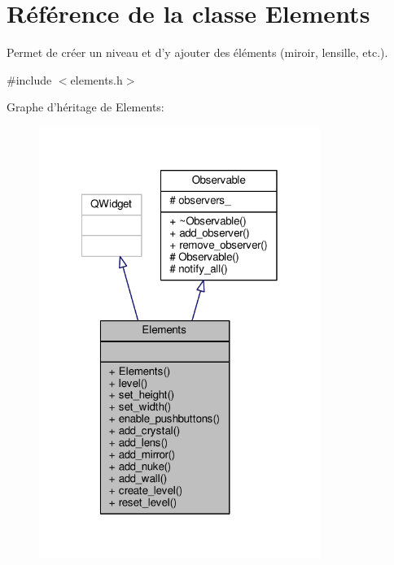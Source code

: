 \hypertarget{classElements}{\section{Référence de la classe Elements}
\label{classElements}
}


Permet de créer un niveau et d’y ajouter des éléments (miroir, lensille, etc.).  




{\ttfamily \#include $<$elements.\+h$>$}



Graphe d'héritage de Elements\+:\nopagebreak
\begin{figure}[H]
\begin{center}
\leavevmode
\includegraphics[width=259pt]{da/d2c/classElements__inherit__graph}
\end{center}
\end{figure}


